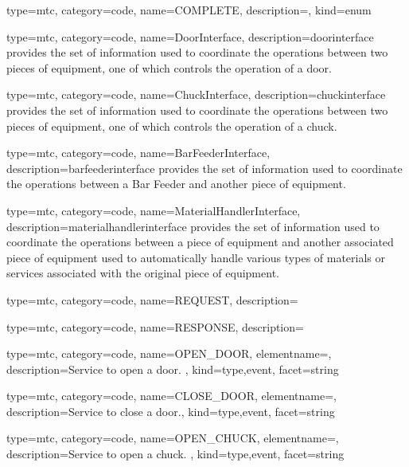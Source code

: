 {
  type=mtc,
  category=code,
  name={COMPLETE},
  description={},
  kind={enum}
}


{
  type=mtc,
  category=code,
  name={DoorInterface},
  description={\gls{doorinterface} provides the set of information used to coordinate the operations between two pieces of equipment, one of which controls the operation of a door. }
}


{
  type=mtc,
  category=code,
  name={ChuckInterface},
  description={\gls{chuckinterface} provides the set of information used to coordinate the operations between two pieces of equipment, one of which controls the operation of a chuck.  }
}


{
  type=mtc,
  category=code,
  name={BarFeederInterface},
  description={\gls{barfeederinterface} provides the set of information used to coordinate the operations between a Bar Feeder and another piece of equipment.  }
}


{
  type=mtc,
  category=code,
  name={MaterialHandlerInterface},
  description={\gls{materialhandlerinterface} provides the set of information used to coordinate the operations between a piece of equipment and another associated piece of equipment used to automatically handle various types of materials or services associated with the original piece of equipment. }
}


{
  type=mtc,
  category=code,
  name={REQUEST},
  description={}
}


{
  type=mtc,
  category=code,
  name={RESPONSE},
  description={}
}


{
  type=mtc,
  category=code,
  name={OPEN\_DOOR},
  elementname=,
  description={Service to open a door. },
  kind={type,event},
  facet={\gls{string}}
}


{
  type=mtc,
  category=code,
  name={CLOSE\_DOOR},
  elementname=,
  description={Service to close a door.},
  kind={type,event},
  facet={\gls{string}}
}


{
  type=mtc,
  category=code,
  name={OPEN\_CHUCK},
  elementname=,
  description={Service to open a chuck. },
  kind={type,event},
  facet={\gls{string}}
}


